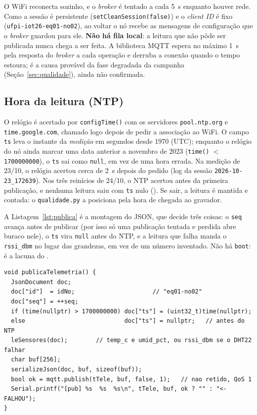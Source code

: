 O WiFi reconecta sozinho, e o \emph{broker} é tentado a cada
\SI{5}{\second} enquanto houver rede. Como a sessão é persistente
(\texttt{setCleanSession(false)}) e o \emph{client ID} é fixo
(\texttt{ufpi-iot26-eq01-no02}), ao voltar o nó recebe as mensagens
de configuração que o \emph{broker} guardou para ele. \textbf{Não há
fila local}: a leitura que não pôde ser publicada nunca chega a ser
feita. A biblioteca MQTT espera no máximo \SI{1}{\second} pela resposta
do \emph{broker} a cada operação e derruba a conexão quando o tempo
estoura; é a causa provável da fase degradada da campanha
(Seção~\ref{sec:qualidade}), ainda não confirmada.

\subsection{Hora da leitura (NTP)}

O relógio é acertado por \texttt{configTime()} com os servidores
\texttt{pool.ntp.org} e \texttt{time.google.com}, chamado logo depois de
pedir a associação ao WiFi. O campo \texttt{ts} leva o instante da
\emph{medição} em segundos desde 1970 (UTC); enquanto o relógio do nó
ainda marcar uma data anterior a novembro de 2023 (\texttt{time()} $<$
\texttt{1700000000}), o \texttt{ts} sai como \texttt{null}, em vez de uma
hora errada. Na medição de 23/10, o relógio acertou cerca de
\SI{2}{\second} depois do pedido (log da sessão
\texttt{2026-10-23\_172639}). Nos três reinícios de 24/10, o NTP acertou
antes da primeira publicação, e nenhuma leitura saiu com \texttt{ts}
nulo (). Se sair, a leitura é mantida e contada: o
\texttt{qualidade.py} a posiciona pela hora de chegada ao gravador.

A Listagem~\ref{lst:publica} é a montagem do JSON, que decide três
coisas: o \texttt{seq} avança antes de publicar (por isso só uma
publicação tentada e perdida abre buraco nele), o \texttt{ts} vira
\texttt{null} antes do NTP, e a leitura que falha manda o
\texttt{rssi\_dbm} no lugar das grandezas, em vez de um número
inventado. Não há \texttt{boot}: é a lacuna do .

\begin{lstlisting}[style=arduino,
  caption={Montagem e publicação da leitura (\texttt{sketch.ino}, \emph{commit} \texttt{7b4482e}; trecho sem alteração)},
  label={lst:publica}]
void publicaTelemetria() {
  JsonDocument doc;
  doc["id"]  = idNo;                      // "eq01-no02"
  doc["seq"] = ++seq;
  if (time(nullptr) > 1700000000) doc["ts"] = (uint32_t)time(nullptr);
  else                            doc["ts"] = nullptr;   // antes do NTP
  leSensores(doc);        // temp_c e umid_pct, ou rssi_dbm se o DHT22 falhar
  char buf[256];
  serializeJson(doc, buf, sizeof(buf));
  bool ok = mqtt.publish(tTele, buf, false, 1);   // nao retido, QoS 1
  Serial.printf("[pub] %s  %s  %s\n", tTele, buf, ok ? "" : "<- FALHOU");
}
\end{lstlisting}

